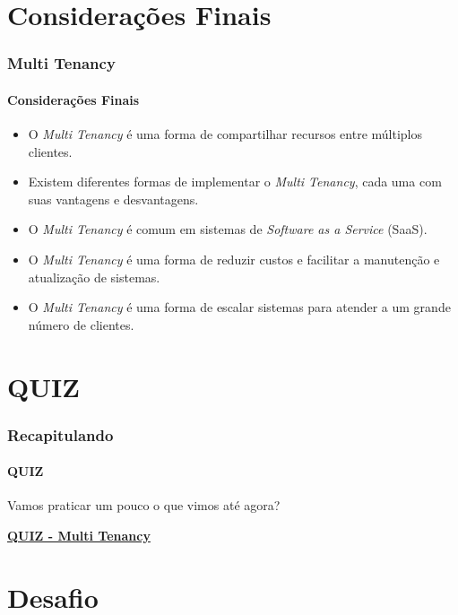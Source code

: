 \documentclass[
	9pt, %
	t, %
]{beamer}
\begin{document}
\section{Considerações Finais}

\begin{frame}
	\frametitle{Multi Tenancy}
	\framesubtitle{Considerações Finais}

	\begin{itemize}
		\item O \textit{Multi Tenancy} é uma forma de compartilhar recursos entre múltiplos clientes.
		\item Existem diferentes formas de implementar o \textit{Multi Tenancy}, cada uma com suas vantagens e desvantagens.
		\item O \textit{Multi Tenancy} é comum em sistemas de \textit{Software as a Service} (SaaS).
		\item O \textit{Multi Tenancy} é uma forma de reduzir custos e facilitar a manutenção e atualização de sistemas.
		\item O \textit{Multi Tenancy} é uma forma de escalar sistemas para atender a um grande número de clientes.
	\end{itemize}

\end{frame}

\section{QUIZ}

\begin{frame}
	\frametitle{Recapitulando}
	\framesubtitle{QUIZ}

	Vamos praticar um pouco o que vimos até agora?
	\vfill

	\bigskip
	\centering

	\href{https://quizizz.com/admin/quiz/65c20cca036b2c1121fc8392?source=admin&trigger=quizPage}{\textbf{QUIZ - Multi Tenancy}}
	\vfill
		
\end{frame}


\section{Desafio}
\end{document}
